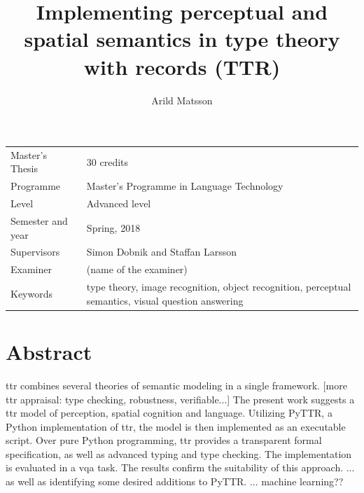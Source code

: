 \documentclass[11pt, a4paper]{article}
\title{Implementing perceptual and spatial semantics in type theory with records (TTR)}
\author{Arild Matsson}
\date{}
\begin{document}
\begin{titlepage}

\maketitle

\vfill

\begingroup
\renewcommand*{\arraystretch}{1.2}
\begin{tabular}{l@{\hskip 20mm}l}
\hline
Master's Thesis & 30 credits\\
Programme & Master’s Programme in Language Technology\\
Level & Advanced level \\
Semester and year & Spring, 2018\\
Supervisors & Simon Dobnik and Staffan Larsson\\
Examiner & (name of the examiner)\\
Keywords & type theory, image recognition, object recognition, perceptual semantics, visual question answering
\end{tabular}
\endgroup

\thispagestyle{empty}
\end{titlepage}

\newpage
\singlespacing
\glsresetall
\section*{Abstract}

\Gls{ttr} combines several theories of semantic modeling in a single framework.
[more ttr appraisal: type checking, robustness, verifiable...]
The present work suggests a \gls{ttr} model of perception, spatial cognition and language.
Utilizing PyTTR, a Python implementation of \gls{ttr}, the model is then implemented as an executable script.
Over pure Python programming, \gls{ttr} provides a transparent formal specification, as well as advanced typing and type checking.
The implementation is evaluated in a \acrlong{vqa} task.
The results confirm the suitability of this approach.
... as well as identifying some desired additions to PyTTR.
... machine learning??
\end{document}

